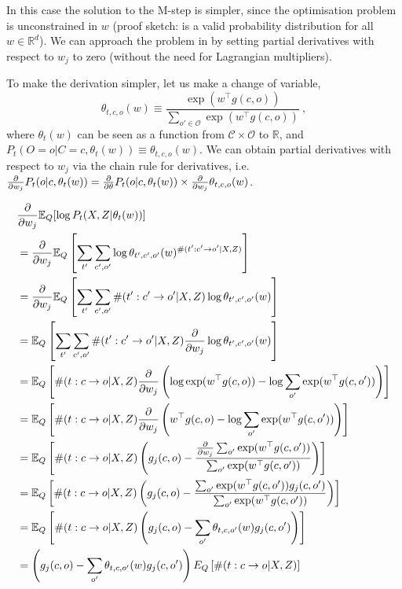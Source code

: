 In this case the solution to the M-step is simpler, since the optimisation problem is unconstrained in $w$ (proof sketch:  is a valid probability distribution for all $w \in \mathbb R^d$).
We can approach the problem in  by setting partial derivatives with respect to $w_j$ to zero (without the need for Lagrangian multipliers).

To make the derivation simpler, let us make a change of variable,
\begin{equation}
	\theta_{t, c,o}(w) \equiv \frac{\exp(w^\top g(c, o))}{\sum_{o' \in \mathcal O} \exp(w^\top g(c, o))} ~,
\end{equation}
where $\theta_{t}(w)$ can be seen as a function from $\mathcal C \times \mathcal O$ to $\mathbb R$, and $P_t(O=o|C=c, \theta_t(w)) \equiv \theta_{t,c,o}(w)$.
We can obtain partial derivatives with respect to $w_j$ via the chain rule for derivatives, i.e. $\frac{\partial}{\partial w_j}P_t(o|c, \theta_t(w)) = \frac{\partial}{\partial \theta}P_t(o|c, \theta_t(w))\times \frac{\partial}{\partial w_j}\theta_{t,c,o}(w)$.

\begin{subequations}
\begin{align}
	&\frac{\partial}{\partial w_j} \mathbb E_Q[\log P_t(X, Z|\theta_t(w))] 	\\
	&= \frac{\partial}{\partial w_j} \mathbb E_Q\left[\sum_{t'}\sum_{c',o'} \log \theta_{t',c',o'}(w)^{\#(t':c'\rightarrow o' |X, Z)}\right] \\
	&= \frac{\partial}{\partial w_j} \mathbb E_Q\left[\sum_{t'}\sum_{c',o'} \#(t':c'\rightarrow o' |X, Z) \log \theta_{t',c',o'}(w)\right] \\
	&= \mathbb E_Q\left[\sum_{t'}\sum_{c',o'} \#(t':c'\rightarrow o' |X, Z) \frac{\partial}{\partial w_j} \log \theta_{t',c',o'}(w)\right] \\
	&= \mathbb E_Q\left[\#(t:c\rightarrow o |X, Z) \frac{\partial}{\partial w_j} \left( \log \exp (w^\top g(c, o)) - \log \sum_{o'} \exp(w^\top g(c, o')) \right) \right] \\
	&= \mathbb E_Q\left[\#(t:c\rightarrow o |X, Z) \frac{\partial}{\partial w_j} \left( w^\top g(c, o) - \log \sum_{o'} \exp(w^\top g(c, o')) \right) \right] \\
	&= \mathbb E_Q\left[\#(t:c\rightarrow o |X, Z)  \left( g_j(c, o) - \frac{ \frac{\partial}{\partial w_j}\sum_{o'}\exp(w^\top g(c, o'))}{\sum_{o'} \exp(w^\top g(c, o'))}  \right) \right] \\
	&= \mathbb E_Q\left[\#(t:c\rightarrow o |X, Z)  \left( g_j(c, o) - \frac{\sum_{o'} \exp(w^\top g(c, o'))g_j(c, o')}{\sum_{o'} \exp(w^\top g(c, o'))}  \right) \right] \\
	&= \mathbb E_Q\left[\#(t:c\rightarrow o |X, Z)  \left( g_j(c, o) - \sum_{o'} \theta_{t,c,o'}(w) g_j(c, o') \right) \right] \\
	&= \left(g_j(c, o) - \sum_{o'} \theta_{t,c,o'}(w) g_j(c, o') \right) E_Q\left[\#(t:c\rightarrow o |X, Z)\right]
\end{align}
\end{subequations}

